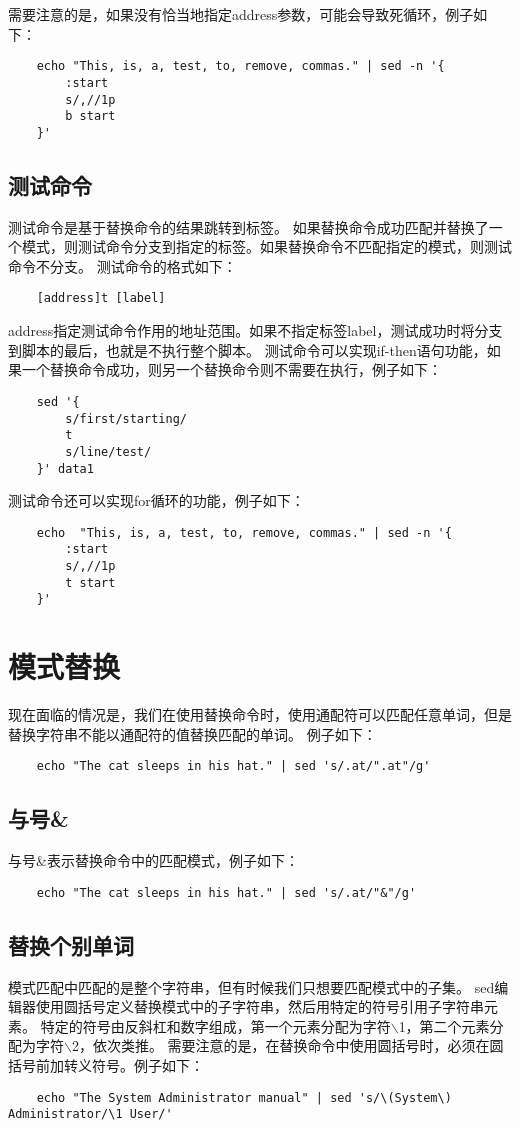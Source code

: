\documentclass[a4paper,left=2.5cm,right=2.5cm,11pt]{article}
\begin{document}
	需要注意的是，如果没有恰当地指定address参数，可能会导致死循环，例子如下：
	\begin{lstlisting}
	echo "This, is, a, test, to, remove, commas." | sed -n '{
		:start
		s/,//1p
		b start
	}'
	\end{lstlisting}

\subsection{测试命令}
	测试命令是基于替换命令的结果跳转到标签。
	如果替换命令成功匹配并替换了一个模式，则测试命令分支到指定的标签。如果替换命令不匹配指定的模式，则测试命令不分支。
	测试命令的格式如下：
	\begin{lstlisting}
	[address]t [label]
	\end{lstlisting}

	address指定测试命令作用的地址范围。如果不指定标签label，测试成功时将分支到脚本的最后，也就是不执行整个脚本。
	测试命令可以实现if-then语句功能，如果一个替换命令成功，则另一个替换命令则不需要在执行，例子如下：
	\begin{lstlisting}
	sed '{
		s/first/starting/
		t
		s/line/test/
	}' data1
	\end{lstlisting}

	测试命令还可以实现for循环的功能，例子如下：
	\begin{lstlisting}
	echo  "This, is, a, test, to, remove, commas." | sed -n '{
		:start
		s/,//1p
		t start
	}'
	\end{lstlisting}

\section{模式替换}
	现在面临的情况是，我们在使用替换命令时，使用通配符可以匹配任意单词，但是替换字符串不能以通配符的值替换匹配的单词。
	例子如下：
	\begin{lstlisting}
	echo "The cat sleeps in his hat." | sed 's/.at/".at"/g'
	\end{lstlisting}

\subsection{与号\&}
	与号\&表示替换命令中的匹配模式，例子如下：
	\begin{lstlisting}
	echo "The cat sleeps in his hat." | sed 's/.at/"&"/g'
	\end{lstlisting}

\subsection{替换个别单词}
	模式匹配中匹配的是整个字符串，但有时候我们只想要匹配模式中的子集。
	sed编辑器使用圆括号定义替换模式中的子字符串，然后用特定的符号引用子字符串元素。
	特定的符号由反斜杠和数字组成，第一个元素分配为字符$\backslash$1，第二个元素分配为字符$\backslash$2，依次类推。
	需要注意的是，在替换命令中使用圆括号时，必须在圆括号前加转义符号。例子如下：
	\begin{lstlisting}
	echo "The System Administrator manual" | sed 's/\(System\) Administrator/\1 User/'
	\end{lstlisting}
\end{document}
